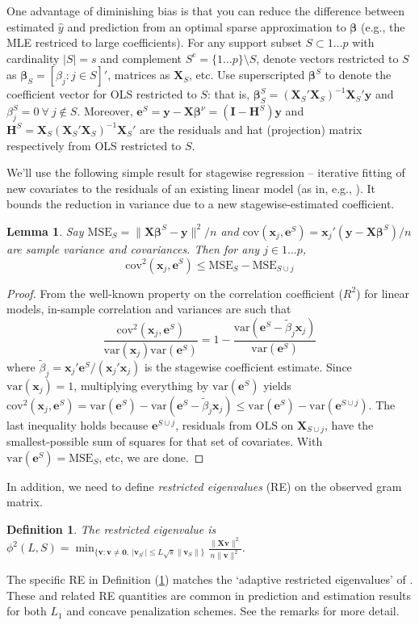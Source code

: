 \documentclass[12pt]{article}
\newtheorem{definition}{\sc Definition}[section]
\newtheorem{lemma}{\sc Lemma}[section]
\newcommand{\bs}[1]{\boldsymbol{#1}}
\newcommand{\mr}[1]{\mathrm{#1}}
\newcommand{\bm}[1]{\mathbf{#1}}
\begin{document}
One advantage of diminishing bias is that you can reduce the difference between estimated $\hat y$ and prediction from an optimal sparse approximation to
$\bs{\beta}$ (e.g., the MLE restriced to large coefficients).  For any support subset $S \subset 1\ldots p$ with cardinality $|S|=s$ and complement $S^c = \{1\ldots p\}\setminus S$, denote vectors
restricted to $S$ as $\bm{\beta}_S = [\beta_j:j\in S]'$, matrices as $\bm{X}_S$, etc.  Use superscripted $\bs{\beta}^S$ to denote the coefficient vector for OLS restricted to $S$: that is, $\bs{\beta}^S_S = (\bm{X}_S'\bm{X}_S)^{-1}\bm{X}_S'\bm{y}$ and $\beta^{S}_j = 0~\forall~j\notin S$.  Moreover, 
$\bm{e}^S = \bm{y}-\bm{X}\bs{\beta}^\nu = (\bm{I}-\bm{H}^S)\bm{y}$ and 
$\bm{H}^S = \bm{X}_S(\bm{X}_S'\bm{X}_S)^{-1}\bm{X}_S'$ are the residuals and hat (projection) matrix respectively from OLS restricted to $S$.

We'll use the following simple result for stagewise regression -- iterative fitting of new covariates to the residuals of an existing linear model (as in, e.g., \citealt{goldberger_stepwise_1961}). It bounds the reduction in variance due to a new stagewise-estimated coefficient.
\begin{lemma}\label{SSElemma}
Say $\mr{MSE}_S = \|\bm{X}\bs{\beta}^S-\bm{y}\|^2/n$ and 
$\mr{cov}(\bs{x}_j,\bm{e}^S) = \bs{x}_j'(\bm{y}-\bm{X}\bs{\beta}^S)/n$ are sample variance and covariances.  Then for any $j \in 1\ldots p$, 
\[
\mr{cov}^2(\bs{x}_j,\bm{e}^S) \leq \mr{MSE}_S - \mr{MSE}_{S\cup j}
\]
\end{lemma}
\begin{proof}
From the well-known property on the correlation coefficient ($R^2$) for linear models,   
in-sample correlation and variances are such that
\[
\frac{\mr{cov}^2(\bs{x}_j,\bm{e}^S)}{\mr{var}(\bs{x}_j)\mr{var}(\bm{e}^S)} = 1 - \frac{\mr{var}(\bm{e}^S-\tilde\beta_j\bs{x}_j)}{\mr{var}(\bm{e}^S)}
\]
where $\tilde\beta_j = \bs{x}_j'\bm{e}^S/(\bs{x}_j'\bs{x}_j)$ is the stagewise coefficient estimate.  Since $\mr{var}(\bs{x}_j)=1$, multiplying everything by $\mr{var}(\bm{e}^S)$ yields $\mr{cov}^2(\bs{x}_j,\bm{e}^S) =
\mr{var}(\bm{e}^S) - \mr{var}(\bm{e}^S-\tilde\beta_j\bs{x}_j)
\leq \mr{var}(\bm{e}^S) - \mr{var}(\bm{e}^{S\cup j})$.
The last inequality holds because $\bm{e}^{S\cup j}$, residuals from OLS on $\bm{X}_{S\cup j}$, have the smallest-possible sum of squares for that set of covariates.  With $\mr{var}(\bm{e}^S) = \mr{MSE}_S$, etc, we are done.
\end{proof}

In addition, we need to define {\it restricted eigenvalues} (RE) on the observed gram matrix.  
\begin{definition}\label{redef}
The restricted eigenvalue is
$
\phi^2(L,S) = \min_{\{\bm{v}: \bm{v}\neq \bm{0},~|\bm{v}_{S^c}| \leq L\sqrt{s}\|\bm{v}_S\|\}}\frac{\|\bm{X}\bm{v}\|^2}{n\|\bm{v}\|^2}$.
\end{definition}
\noindent The specific RE in Definition (\ref{redef}) matches the `adaptive restricted eigenvalues' of \cite{buhlmann_statistics_2011}.  These and related RE quantities are common in prediction and estimation results for both $L_1$ and concave penalization schemes.  See the remarks for more detail.
\end{document}
